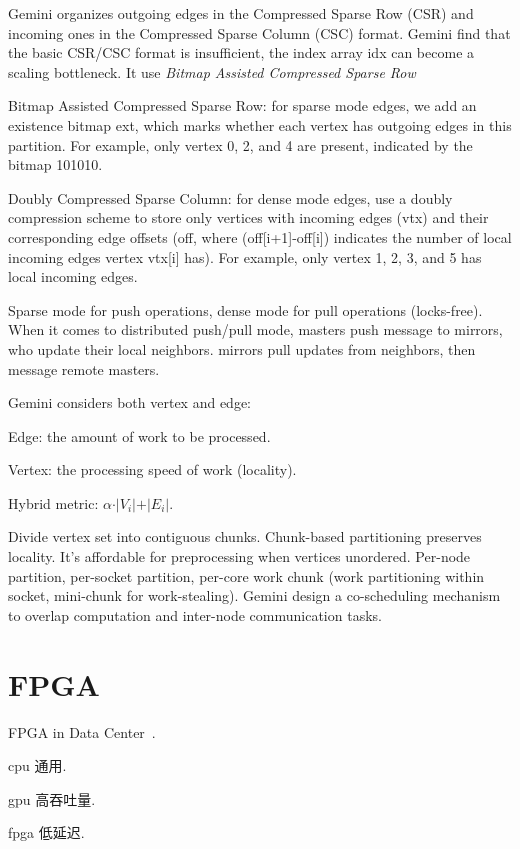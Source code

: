 \documentclass[UTF8,12pt,a4paper]{article}
\begin{document}
Gemini organizes outgoing edges in the Compressed Sparse Row (CSR)
and incoming ones in the Compressed Sparse Column (CSC) format.
Gemini find that the basic CSR/CSC format is insufficient,
the index array idx can become a scaling bottleneck.
It use \textit{Bitmap Assisted Compressed Sparse Row}

Bitmap Assisted Compressed Sparse Row:
for sparse mode edges, we add an existence bitmap ext,
which marks whether each vertex has outgoing edges in this partition.
For example, only vertex 0, 2, and 4 are present,
indicated by the bitmap 101010.

Doubly Compressed Sparse Column: for dense mode edges,
use a doubly compression scheme
to store only vertices with incoming edges (vtx)
and their corresponding edge offsets (off, where
(off[i+1]-off[i]) indicates the number of local
incoming edges vertex vtx[i] has).
For example, only vertex 1, 2, 3, and 5 has local incoming edges.

Sparse mode for push operations, dense mode for pull operations (locks-free).
When it comes to distributed push/pull mode,
masters	push message to mirrors, who update	their	local	neighbors.
mirrors	pull updates from	neighbors, then	message	remote masters.

Gemini considers both	vertex and edge:
\begin{compactitem}
  \item Edge:	the	amount of	work to	be processed.
  \item Vertex:	the	processing speed of	work (locality).
  \item Hybrid metric: $\alpha \cdot \vert V_i \vert + \vert E_i \vert$.
\end{compactitem}

Divide vertex	set into contiguous chunks.
Chunk-based partitioning preserves locality.
It's affordable	for preprocessing	when vertices	unordered.
Per-node partition, per-socket partition, per-core work chunk
(work partitioning within socket, mini-chunk for work-stealing).
Gemini design a co-scheduling mechanism to
overlap computation and inter-node communication tasks.
\clearpage

\section{FPGA}
FPGA in Data Center~\cite{DBLP:conf/isca/Putnam14}.

\begin{compactitem}
  \item cpu 通用.
  \item gpu 高吞吐量.
  \item fpga 低延迟.
\end{compactitem}
\end{document}
